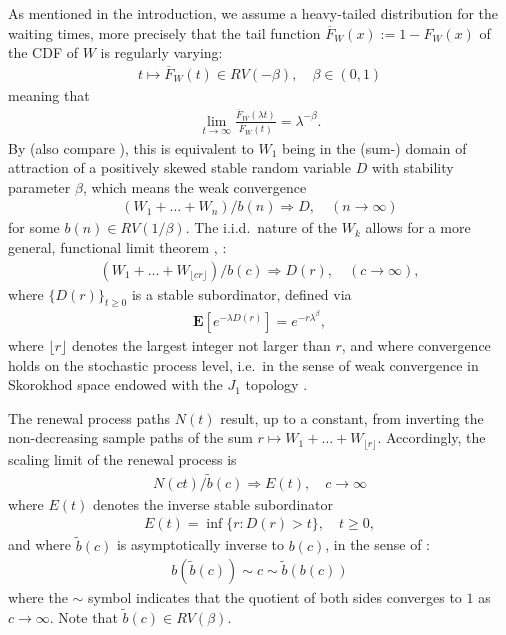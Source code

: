 \documentclass[12pt]{article}
\theoremstyle{definition}
\theoremstyle{remark}
\numberwithin{equation}{section}
\newcommand{\ex}{\mathbf {E}}
\newcommand{\1}{\mathbf 1}
\begin{document}
As mentioned in the introduction, we assume a heavy-tailed distribution 
for the waiting times, more precisely that the tail function 
$\overline F_W(x) := 1 - F_W(x)$ of the CDF of $W$ is regularly varying:
\begin{align}
t \mapsto \overline F_W(t) \in RV(-\beta), \quad \beta \in (0,1)
\end{align}
meaning that \cite{seneta,thebook}
\begin{align*}
\lim_{t \to \infty}\frac{\overline F_W(\lambda t)}{\overline F_W(t)}
= \lambda^{-\beta}.
\end{align*}
By \cite[Cor.~8.2.19]{thebook} (also compare \cite[Th.~4.5.1]{Whitt2010}), this is equivalent to $W_1$ being in the 
(sum-) domain of attraction of a positively skewed stable random variable $D$ with 
stability parameter $\beta$, which means the weak convergence
\begin{align}
(W_1 + \ldots + W_n)/b(n) \Rightarrow D, \quad (n \to \infty)
\end{align}
for some $b(n) \in RV(1/\beta)$.
The i.i.d.\ nature of the $W_k$ allows for a more general, functional limit
theorem \cite[Ex.~11.2.18]{thebook}, \cite[Th.~4.5.3]{Whitt2010}:
\begin{align}
(W_1 + \ldots + W_{\lfloor cr \rfloor}) / b(c) \Rightarrow D(r), 
\quad (c \to \infty),
\end{align}
where $\{D(r)\}_{t \ge 0}$ is a stable subordinator, defined via 
\begin{align}
\ex[e^{-\lambda D(r)}] = e^{-r \lambda^\beta},
\end{align}
where $\lfloor r \rfloor$ denotes the largest integer not larger than $r$,
and where convergence holds on the stochastic process level, i.e.\ in the sense
of weak convergence in Skorokhod space endowed with the $J_1$ topology
\cite[Sec.~3.3]{Whitt2010}. 

The renewal process paths $N(t)$ result, up to a constant, from
inverting the non-decreasing sample paths of the sum
$r \mapsto W_1 + \ldots + W_{\lfloor r \rfloor}$.
Accordingly, the scaling limit of the renewal process is \cite{limitCTRW} 
\begin{align}
N(ct) / \tilde b(c) \Rightarrow E(t), \quad c \to \infty
\end{align}
where $E(t)$ denotes the inverse stable subordinator \cite{invSubord}
\begin{align}
E(t) = \inf\{r: D(r) > t\}, \quad t \ge 0,
\end{align}
and where $\tilde b(c)$ is asymptotically inverse to $b(c)$, in the sense
of \cite[p.20]{seneta}: 
\begin{align}
b(\tilde b(c)) \sim c \sim \tilde b(b(c))
\end{align}
where the $\sim$ symbol indicates that the quotient of both sides converges to
$1$ as $c \to \infty$. 
Note that $\tilde b(c) \in RV(\beta)$. 
\end{document}
